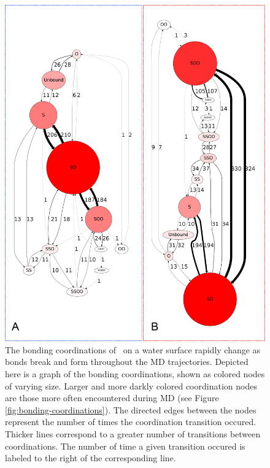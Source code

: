 \begin{figure}[h!]
	\begin{center}
		\includegraphics[scale=1.0]{images/coordinations/coordination-transitions.png}
		\caption{The bonding coordinations of \suldiox~on a water surface rapidly change as bonds break and form throughout the MD trajectories. Depicted here is a graph of the bonding coordinations, shown as colored nodes of varying size. Larger and more darkly colored coordination nodes are those more often encountered during MD (see Figure \ref{fig:bonding-coordinations}). The directed edges between the nodes represent the number of times the coordination transition occured. Thicker lines correspond to a greater number of transitions between coordinations. The number of time a given transition occured is labeled to the right of the corresponding line.}
		\label{fig:coordination-transitions}
	\end{center}
\end{figure}

